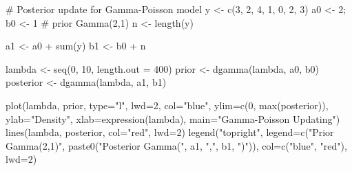 \documentclass[
  letterpaper,
  DIV=11,
  numbers=noendperiod]{scrreprt}
\newenvironment{Shaded}{\begin{snugshade}}{\end{snugshade}}
\newcommand{\AttributeTok}[1]{\textcolor[rgb]{0.40,0.45,0.13}{#1}}
\newcommand{\CommentTok}[1]{\textcolor[rgb]{0.37,0.37,0.37}{#1}}
\newcommand{\DecValTok}[1]{\textcolor[rgb]{0.68,0.00,0.00}{#1}}
\newcommand{\FunctionTok}[1]{\textcolor[rgb]{0.28,0.35,0.67}{#1}}
\newcommand{\NormalTok}[1]{\textcolor[rgb]{0.00,0.23,0.31}{#1}}
\newcommand{\OtherTok}[1]{\textcolor[rgb]{0.00,0.23,0.31}{#1}}
\newcommand{\SpecialCharTok}[1]{\textcolor[rgb]{0.37,0.37,0.37}{#1}}
\newcommand{\StringTok}[1]{\textcolor[rgb]{0.13,0.47,0.30}{#1}}
\begin{document}
\begin{Shaded}
\begin{Highlighting}[]
\CommentTok{\# Posterior update for Gamma{-}Poisson model}
\NormalTok{y }\OtherTok{\textless{}{-}} \FunctionTok{c}\NormalTok{(}\DecValTok{3}\NormalTok{, }\DecValTok{2}\NormalTok{, }\DecValTok{4}\NormalTok{, }\DecValTok{1}\NormalTok{, }\DecValTok{0}\NormalTok{, }\DecValTok{2}\NormalTok{, }\DecValTok{3}\NormalTok{)}
\NormalTok{a0 }\OtherTok{\textless{}{-}} \DecValTok{2}\NormalTok{; b0 }\OtherTok{\textless{}{-}} \DecValTok{1}   \CommentTok{\# prior Gamma(2,1)}
\NormalTok{n }\OtherTok{\textless{}{-}} \FunctionTok{length}\NormalTok{(y)}

\NormalTok{a1 }\OtherTok{\textless{}{-}}\NormalTok{ a0 }\SpecialCharTok{+} \FunctionTok{sum}\NormalTok{(y)}
\NormalTok{b1 }\OtherTok{\textless{}{-}}\NormalTok{ b0 }\SpecialCharTok{+}\NormalTok{ n}

\NormalTok{lambda }\OtherTok{\textless{}{-}} \FunctionTok{seq}\NormalTok{(}\DecValTok{0}\NormalTok{, }\DecValTok{10}\NormalTok{, }\AttributeTok{length.out =} \DecValTok{400}\NormalTok{)}
\NormalTok{prior }\OtherTok{\textless{}{-}} \FunctionTok{dgamma}\NormalTok{(lambda, a0, b0)}
\NormalTok{posterior }\OtherTok{\textless{}{-}} \FunctionTok{dgamma}\NormalTok{(lambda, a1, b1)}

\FunctionTok{plot}\NormalTok{(lambda, prior, }\AttributeTok{type=}\StringTok{"l"}\NormalTok{, }\AttributeTok{lwd=}\DecValTok{2}\NormalTok{, }\AttributeTok{col=}\StringTok{"blue"}\NormalTok{, }\AttributeTok{ylim=}\FunctionTok{c}\NormalTok{(}\DecValTok{0}\NormalTok{, }\FunctionTok{max}\NormalTok{(posterior)),}
     \AttributeTok{ylab=}\StringTok{"Density"}\NormalTok{, }\AttributeTok{xlab=}\FunctionTok{expression}\NormalTok{(lambda),}
     \AttributeTok{main=}\StringTok{"Gamma{-}Poisson Updating"}\NormalTok{)}
\FunctionTok{lines}\NormalTok{(lambda, posterior, }\AttributeTok{col=}\StringTok{"red"}\NormalTok{, }\AttributeTok{lwd=}\DecValTok{2}\NormalTok{)}
\FunctionTok{legend}\NormalTok{(}\StringTok{"topright"}\NormalTok{,}
       \AttributeTok{legend=}\FunctionTok{c}\NormalTok{(}\StringTok{"Prior Gamma(2,1)"}\NormalTok{, }\FunctionTok{paste0}\NormalTok{(}\StringTok{"Posterior Gamma("}\NormalTok{, a1, }\StringTok{","}\NormalTok{, b1, }\StringTok{")"}\NormalTok{)),}
       \AttributeTok{col=}\FunctionTok{c}\NormalTok{(}\StringTok{"blue"}\NormalTok{, }\StringTok{"red"}\NormalTok{), }\AttributeTok{lwd=}\DecValTok{2}\NormalTok{)}
\end{Highlighting}
\end{Shaded}
\end{document}
